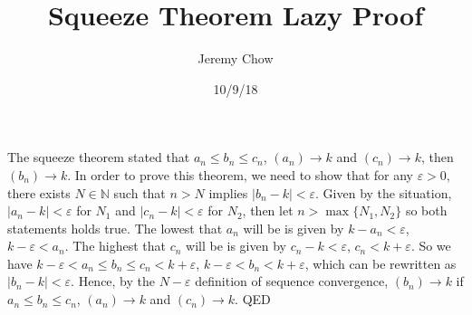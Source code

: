 \documentclass[12pt]{article}
\title{Squeeze Theorem Lazy Proof}
\author{Jeremy Chow}
\date{10/9/18}
\begin{document}
\maketitle
The squeeze theorem stated that $a_{n}\leq b_{n} \leq c_{n}$, $(a_{n})\to k  $ and $(c_{n})\to k$, then $(b_{n})\to k$. In order to prove this theorem, we need to show that for any $\varepsilon>0$, there exists $N\in \mathbb{N}$ such that $n>N$ implies $|b_{n}-k|<\varepsilon$. Given by the situation, $|a_{n}-k|<\varepsilon$ for $N_{1}$ and $|c_{n}-k|<\varepsilon$ for $N_{2}$, then let $n>\max\{N_{1},N_{2}\}$ so both statements holds true. The lowest that $a_{n}$ will be is given by $k-a_{n}<\varepsilon$, $k-\varepsilon<a_{n}$. The highest that $c_{n}$ will be is given by $c_{n}-k<\varepsilon$, $c_{n}<k+\varepsilon$. So we have $k-\varepsilon<a_{n}\leq b_{n} \leq c_{n}<k+\varepsilon$, $k-\varepsilon<b_{n}<k+\varepsilon$, which can be rewritten as $|b_{n}-k|<\varepsilon$. Hence, by the $N-\varepsilon$ definition of sequence convergence, $(b_{n})\to k$ if $a_{n}\leq b_{n} \leq c_{n}$, $(a_{n})\to k  $ and $(c_{n})\to k$. QED
\end{document}
